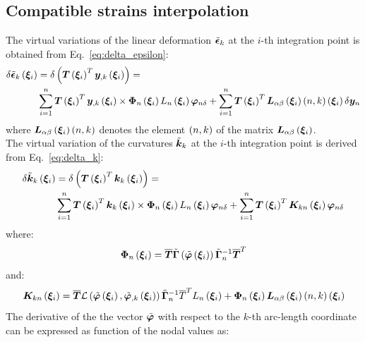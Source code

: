 \subsection{Compatible strains interpolation}
The virtual variations of the linear deformation $\tilde{\bm{\epsilon} }_k $ at the $i$-th integration point is obtained from Eq.~\ref{eq:delta_epsilon}:
\begin{equation}
\begin{split}
\delta \tilde{\bm{\epsilon} }_k \left(  \bm{ \xi }_{ i }  \right) & = \delta \left(  \bm{T}\left(  \bm{ \xi }_{ i }  \right)^T \bm{y}_{,k} \left(  \bm{ \xi }_{ i }  \right)  \right) = \\
& \sum_{i=1}^n \bm{T}\left(  \bm{ \xi }_{ i }  \right)^T \bm{y}_{,k}\left(  \bm{ \xi }_{ i }  \right) \times \bm{\Phi}_{n} \left(  \bm{ \xi }_{ i }  \right) L_n \left(  \bm{ \xi }_{ i }  \right) \bm{\varphi}_{n \delta} + \sum_{i=1}^n \bm{T}\left(  \bm{ \xi }_{ i }  \right)^T \bm{L}_{\alpha \beta} \left(  \bm{ \xi }_{ i }  \right) \left(  n, k  \right) \left(  \bm{ \xi }_{ i }  \right) \delta \bm{y}_{n}
\end{split}
\label{eq:delta_epsilon_i}
\end{equation}
where $\bm{L}_{\alpha \beta} \left(  \bm{ \xi }_{ i }  \right) \left(  n, k  \right)$ denotes the element $\left( n, k \right)$ of the matrix $\bm{L}_{\alpha \beta} \left(  \bm{ \xi }_{ i }  \right)$.\\
The  virtual variation of the curvatures $\tilde{\bm{k} }_k$ at the $i$-th integration point is derived from Eq.~\ref{eq:delta_k}:
\begin{equation}
\begin{split}
\delta \tilde{\bm{k} }_k \left(  \bm{ \xi }_{ i }  \right) & = \delta \left(  \bm{T}\left(  \bm{ \xi }_{ i }  \right)^T \bm{k}_k \left(  \bm{ \xi }_{ i }  \right) \right) =  \\
& \sum_{i=1}^n \bm{T}\left(  \bm{ \xi }_{ i }  \right)^T \bm{k}_k\left(  \bm{ \xi }_{ i }  \right) \times \bm{\Phi}_n\left(  \bm{ \xi }_{ i }  \right) L_n\left(  \bm{ \xi }_{ i }  \right) \bm{\varphi}_{n \delta} + \sum_{i=1}^n \bm{T}\left(  \bm{ \xi }_{ i }  \right)^T \bm{K}_{kn}\left(  \bm{ \xi }_{ i }  \right) \bm{\varphi}_{n \delta}
\end{split}
\label{eq:delta_k_i}
\end{equation}
where:
\begin{equation}
\bm{\Phi}_{n} \left(  \bm{ \xi }_{ i }  \right) = \overline{\bm{T}}  \tilde{ \bm{\Gamma} } \left(  \tilde{\bm{\varphi}} \left(  \bm{ \xi }_{ i }  \right)  \right) \tilde{ \bm{\Gamma} }_n^{-1} \overline{\bm{T}}^T
\end{equation}
and:
\begin{equation}
\bm{K}_{kn} \left(  \bm{ \xi }_{ i }  \right) =
\overline{\bm{T}} \mathcal{L} \left(  \tilde{\bm{\varphi}}\left(  \bm{ \xi }_{ i }  \right), \tilde{\bm{\varphi}}_{,k}\left(  \bm{ \xi }_{ i }  \right)  \right) \tilde{ \bm{\Gamma} }_{n}^{-1} \overline{T}^T L_n\left(  \bm{ \xi }_{ i }  \right) + \bm{\Phi}_{n}\left(  \bm{ \xi }_{ i }  \right) \bm{L}_{\alpha \beta} \left(  \bm{ \xi }_{ i }  \right) \left(  n, k  \right) \left(  \bm{ \xi }_{ i }  \right)
\end{equation}
The derivative of the the vector $\tilde{\bm{\varphi}}$ with respect to the $k$-th arc-length coordinate can be expressed as function of the nodal values as:
